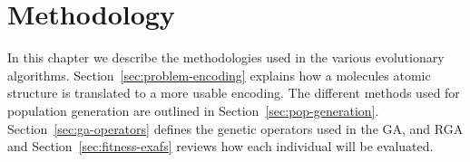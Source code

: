 \chapter{Methodology}

In this chapter we describe the methodologies used in the various evolutionary algorithms. Section~\ref{sec:problem-encoding} explains how a molecules atomic structure is translated to a more usable encoding. The different methods used for population generation are outlined in Section~\ref{sec:pop-generation}. Section~\ref{sec:ga-operators} defines the genetic operators used in the GA, and RGA and Section~\ref{sec:fitness-exafs} reviews how each individual will be evaluated.





% 